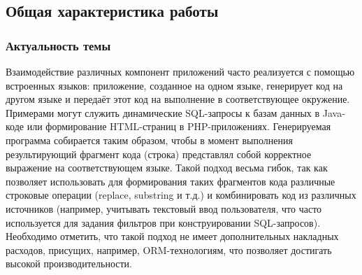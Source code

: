 \subsection*{\Large Общая характеристика работы}
\fontsize{14pt}{15pt}\selectfont
\subsubsection*{\large{Актуальность темы}}

Взаимодействие различных компонент приложений часто реализуется с помощью встроенных языков: приложение, созданное на одном языке, генерирует код на другом языке и передаёт этот код на выполнение в соответствующее окружение. Примерами могут служить динамические SQL-запросы к базам данных в Java-коде или формирование HTML-страниц в PHP-приложениях. Генерируемая программа собирается таким образом, чтобы в момент выполнения результирующий фрагмент кода (строка) представлял собой корректное выражение на соответствующем языке. Такой подход весьма гибок, так как позволяет использовать для формирования таких фрагментов кода различные строковые операции (replace, substring и т.д.) и комбинировать код из различных источников (например, учитывать текстовый ввод пользователя, что часто используется для задания фильтров при конструировании SQL-запросов). Необходимо отметить, что такой подход не имеет дополнительных накладных расходов, присущих, например, ORM-технологиям, что позволяет достигать высокой производительности. 

